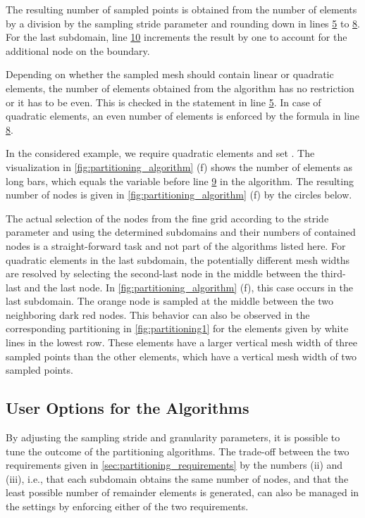 The resulting number of sampled points is obtained from the number of elements by a division by the sampling stride parameter and rounding down in lines \hyperlink{alg:4.5}{5} to \hyperlink{alg:4.8}{8}. For the last subdomain, line \hyperlink{alg:4.10}{10} increments the result by one to account for the additional node on the boundary.

Depending on whether the sampled mesh should contain linear or quadratic elements, the number of elements obtained from the algorithm has no restriction or it has to be even. This is checked in the  statement in line \hyperlink{alg:4.5}{5}. In case of quadratic elements, an even number of elements is enforced by the formula in line \hyperlink{alg:4.8}{8}.

In the considered example, we require quadratic elements and set . The visualization in \cref{fig:partitioning_algorithm} (f) shows the number of elements as long bars, which equals the  variable before line \hyperlink{alg:4.9}{9} in the algorithm. The resulting number of nodes is given in \cref{fig:partitioning_algorithm} (f) by the circles below.

The actual selection of the nodes from the fine grid according to the stride parameter and using the determined subdomains and their numbers of contained nodes is a straight-forward task and not part of the algorithms listed here. For quadratic elements in the last subdomain, the potentially different mesh widths are resolved by selecting the second-last node in the middle between the third-last and the last node. In \cref{fig:partitioning_algorithm} (f), this case occurs in the last subdomain. The orange node is sampled at the middle between the two neighboring dark red nodes. This behavior can also be observed in the corresponding partitioning in \cref{fig:partitioning1} for the elements given by white lines in the lowest row. These elements have a larger vertical mesh width of three sampled points than the other elements, which have a vertical mesh width of two sampled points.

\subsection{User Options for the Algorithms}\label{sec:partitioning_user_options}

By adjusting the sampling stride and granularity parameters, it is possible to tune the outcome of the partitioning algorithms.
The trade-off between the two requirements given in \cref{sec:partitioning_requirements} by the numbers (ii) and (iii), i.e., that each subdomain obtains the same number of nodes, and that the least possible number of remainder elements is generated, can also be managed in the settings by enforcing either of the two requirements.

